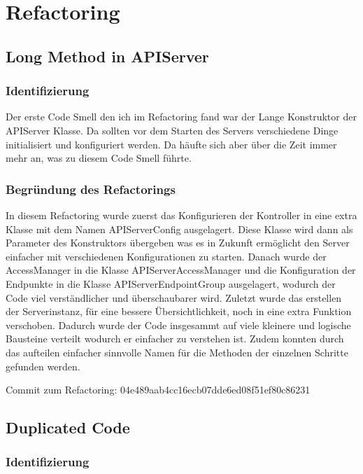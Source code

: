 \chapter{Refactoring}

\section{Long Method in APIServer}

\subsection{Identifizierung}

Der erste Code Smell den ich im Refactoring fand war der Lange Konstruktor der APIServer Klasse.
Da sollten vor dem Starten des Servers verschiedene Dinge initialisiert und konfiguriert werden.
Da häufte sich aber über die Zeit immer mehr an, was zu diesem Code Smell führte.

\subsection{Begründung des Refactorings}

In diesem Refactoring wurde zuerst das Konfigurieren der Kontroller in eine extra Klasse mit dem Namen APIServerConfig ausgelagert.
Diese Klasse wird dann als Parameter des Konstruktors übergeben was es in Zukunft ermöglicht den Server einfacher mit verschiedenen Konfigurationen zu starten.
Danach wurde der AccessManager in die Klasse APIServerAccessManager und die Konfiguration der Endpunkte in die Klasse APIServerEndpointGroup ausgelagert,
wodurch der Code viel verständlicher und überschaubarer wird.
Zuletzt wurde das erstellen der Serverinstanz, für eine bessere Übersichtlichkeit, noch in eine extra Funktion verschoben.
Dadurch wurde der Code insgesammt auf viele kleinere und logische Bausteine verteilt wodurch er einfacher zu verstehen ist.
Zudem konnten durch das aufteilen einfacher sinnvolle Namen für die Methoden der einzelnen Schritte gefunden werden.


Commit zum Refactoring: 04e489aab4cc16ecb07dde6ed08f51ef80c86231

\section{Duplicated Code}

\subsection{Identifizierung}

